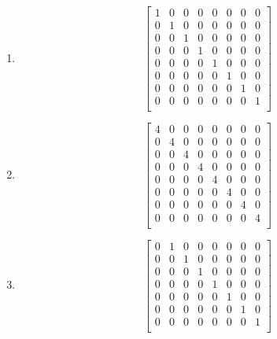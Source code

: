 \documentclass{article}
\theoremstyle{remark}
\begin{document}
\begin{enumerate}
\item
  \begin{displaymath}
    \begin{bmatrix}
      1 & 0 & 0 & 0 & 0 & 0 & 0 & 0 \\
      0 & 1 & 0 & 0 & 0 & 0 & 0 & 0 \\
      0 & 0 & 1 & 0 & 0 & 0 & 0 & 0 \\
      0 & 0 & 0 & 1 & 0 & 0 & 0 & 0 \\
      0 & 0 & 0 & 0 & 1 & 0 & 0 & 0 \\
      0 & 0 & 0 & 0 & 0 & 1 & 0 & 0 \\
      0 & 0 & 0 & 0 & 0 & 0 & 1 & 0 \\
      0 & 0 & 0 & 0 & 0 & 0 & 0 & 1 \\
    \end{bmatrix}
  \end{displaymath}
\item
  \begin{displaymath}
    \begin{bmatrix}
      4 & 0 & 0 & 0 & 0 & 0 & 0 & 0 \\
      0 & 4 & 0 & 0 & 0 & 0 & 0 & 0 \\
      0 & 0 & 4 & 0 & 0 & 0 & 0 & 0 \\
      0 & 0 & 0 & 4 & 0 & 0 & 0 & 0 \\
      0 & 0 & 0 & 0 & 4 & 0 & 0 & 0 \\
      0 & 0 & 0 & 0 & 0 & 4 & 0 & 0 \\
      0 & 0 & 0 & 0 & 0 & 0 & 4 & 0 \\
      0 & 0 & 0 & 0 & 0 & 0 & 0 & 4 \\
    \end{bmatrix}
  \end{displaymath}
\item
  \begin{displaymath}
    \begin{bmatrix}
      0 & 1 & 0 & 0 & 0 & 0 & 0 & 0 \\
      0 & 0 & 1 & 0 & 0 & 0 & 0 & 0 \\
      0 & 0 & 0 & 1 & 0 & 0 & 0 & 0 \\
      0 & 0 & 0 & 0 & 1 & 0 & 0 & 0 \\
      0 & 0 & 0 & 0 & 0 & 1 & 0 & 0 \\
      0 & 0 & 0 & 0 & 0 & 0 & 1 & 0 \\
      0 & 0 & 0 & 0 & 0 & 0 & 0 & 1 \\

\end{bmatrix}
\end{displaymath}
\end{enumerate}
\end{document}
